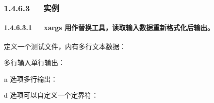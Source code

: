 \documentclass[letterpaper,12pt,english]{sphinxmanual}
\begin{document}
\subsubsection{1.4.6.3   实例}
\label{\detokenize{001software/001install/linux:id23}}

\paragraph{1.4.6.3.1   xargs 用作替换工具，读取输入数据重新格式化后输出。}
\label{\detokenize{001software/001install/linux:id24}}
定义一个测试文件，内有多行文本数据：

\begin{sphinxVerbatim}[commandchars=\\\{\}]

      
      
  
  
     
\end{sphinxVerbatim}

多行输入单行输出：

\begin{sphinxVerbatim}[commandchars=\\\{\}]
                         
\end{sphinxVerbatim}

\sphinxhyphen{}n 选项多行输出：

\begin{sphinxVerbatim}[commandchars=\\\{\}]

  
  
  
  
  
  
  
  
 
\end{sphinxVerbatim}

\sphinxhyphen{}d 选项可以自定义一个定界符：
\end{document}
